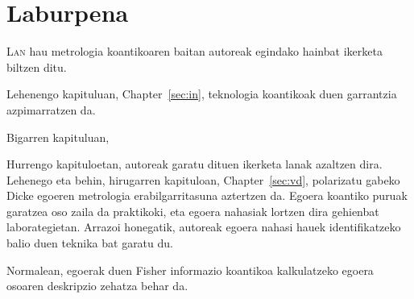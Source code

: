 \section*{Laburpena}
\setcounter{page}{1}
\fancyfoot[LE,RO]{\thepage}

\lettrine[lines=2, findent=3pt,nindent=0pt]{L}{an} hau metrologia koantikoaren baitan autoreak egindako hainbat ikerketa biltzen ditu.

Lehenengo kapituluan, Chapter~\ref{sec:in}, teknologia koantikoak duen garrantzia azpimarratzen da.

Bigarren kapituluan,

Hurrengo kapituloetan, autoreak garatu dituen ikerketa lanak azaltzen dira.
Lehenego eta behin, hirugarren kapituloan, Chapter~\ref{sec:vd}, polarizatu gabeko Dicke egoeren metrologia erabilgarritasuna aztertzen da.
Egoera koantiko puruak garatzea oso zaila da praktikoki, eta egoera nahasiak lortzen dira gehienbat laborategietan.
Arrazoi honegatik, autoreak egoera nahasi hauek identifikatzeko balio duen teknika bat garatu du.

Normalean, egoerak duen Fisher informazio koantikoa kalkulatzeko egoera osoaren deskripzio zehatza behar da.
